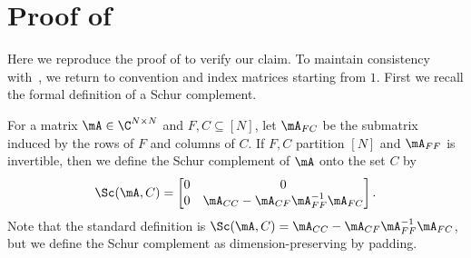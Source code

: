\section{Proof of }\label{sec:app}
Here we reproduce the proof of
%
\cite[Lemma 6.7]{AhmadinejadKeMuPeSiVa19} %
to verify our claim. To maintain consistency with~\cite{AhmadinejadKeMuPeSiVa19}, we return to convention and index matrices starting from $1$.
%
First we  %
recall the formal definition of a Schur complement.

\begin{definition} %
  For a matrix $\mA\in \C^{N\times N}$ and $F,C\subseteq[N]$, let $\mA_{FC}$ be the submatrix induced by the rows of $F$ and columns of $C$. If $F,C$ partition $[N]$ and $\mA_{FF}$ is invertible, then we
%
define  %
the Schur complement of $\mA$ onto the set $C$ by %
%
%
%
%
\[\Sc(\mA,C) = \begin{bmatrix}
0 & 0\\
0 & \mA_{CC}-\mA_{CF}\mA_{FF}^{-1}\mA_{FC}
\end{bmatrix}.\]
Note that the standard definition is $\Sc(\mA,C)=\mA_{CC}-\mA_{CF}\mA_{FF}^{-1}\mA_{FC}$, but we define the Schur complement as dimension-preserving by padding.
%
\end{definition}

